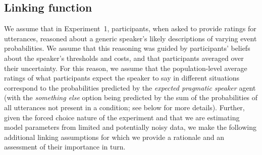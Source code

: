 \documentclass[man, floatsintext]{apa6}
\begin{document}



\subsection{Linking function}

We assume that in Experiment~1, participants, when asked to provide ratings for utterances, reasoned about a generic speaker's 
likely descriptions of varying event probabilities. 
We assume that this reasoning was guided by participants' beliefs about the speaker's thresholds and costs, and 
that participants averaged over their uncertainty. For this reason, we assume that the population-level 
average ratings of what participants expect the speaker to say in different situations 
correspond to the probabilities predicted by the \textit{expected pragmatic speaker} agent (with the \textit{something else}
option being predicted by the sum of the probabilities of all utterances not present in a condition; see below for more details).
Further, given the forced choice nature of the experiment and that we are estimating model 
parameters from limited and potentially noisy data, we make the following additional linking assumptions
for which we provide a rationale and an assessment of their importance in turn.
\end{document}
